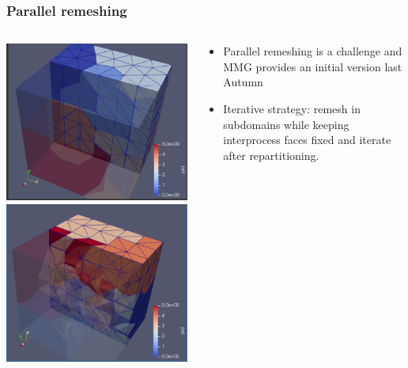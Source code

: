 \documentclass{beamer}
\begin{document}
\begin{frame}
	\frametitle{Parallel remeshing}
	\begin{columns}
		\begin{column}{.5\linewidth}
			\includegraphics[width=.7\linewidth]{figures/par-mesh-n6-1.png}\\
			\includegraphics[width=.7\linewidth]{figures/par-remesh-n6-1.png}
		\end{column}
		\begin{column}{.5\linewidth}
			\begin{itemize}
				\item Parallel remeshing is a challenge and MMG provides an initial version last Autumn
				\item Iterative strategy: remesh in subdomains while keeping interprocess faces fixed and iterate after repartitioning.
			\end{itemize}
		\end{column}
	\end{columns}

	
	

\end{frame}
\end{document}
